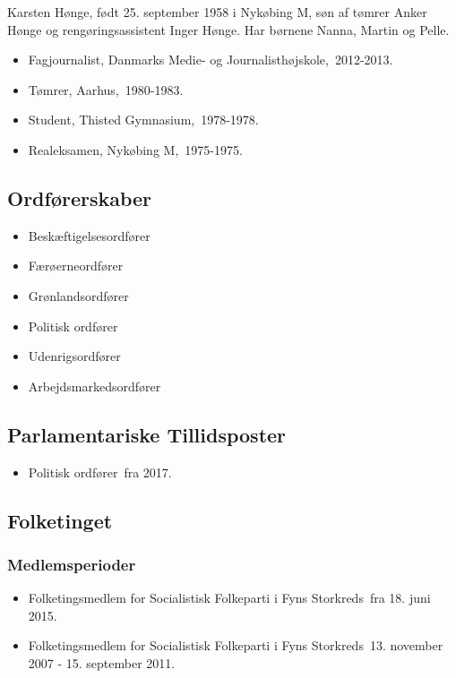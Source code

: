 \documentclass[11pt, a4paper]{awesome-cv}
\begin{document}
\makecvheader[R]
\makelettertitle
\begin{cvletter}
Karsten Hønge, født 25. september 1958 i Nykøbing M, søn af tømrer Anker Hønge og rengøringsassistent Inger Hønge. Har børnene Nanna, Martin og Pelle.

\begin{itemize}
\item Fagjournalist, Danmarks Medie- og Journalisthøjskole, 2012-2013.
\item Tømrer, Aarhus, 1980-1983.
\item Student, Thisted Gymnasium, 1978-1978.
\item Realeksamen, Nykøbing M, 1975-1975.
\end{itemize}
\subsection*{Ordførerskaber}
\begin{itemize}
\item Beskæftigelsesordfører
\item Færøerneordfører
\item Grønlandsordfører
\item Politisk ordfører
\item Udenrigsordfører
\item Arbejdsmarkedsordfører
\end{itemize}
\subsection*{Parlamentariske Tillidsposter}
\begin{itemize}
\item Politisk ordfører fra 2017.
\end{itemize}
\subsection*{Folketinget}
\subsubsection*{Medlemsperioder}
\begin{itemize}
\item Folketingsmedlem for Socialistisk Folkeparti i Fyns Storkreds fra 18. juni 2015.
\item Folketingsmedlem for Socialistisk Folkeparti i Fyns Storkreds 13. november 2007 - 15. september 2011.
\end{itemize}

\end{cvletter}
\end{document}
